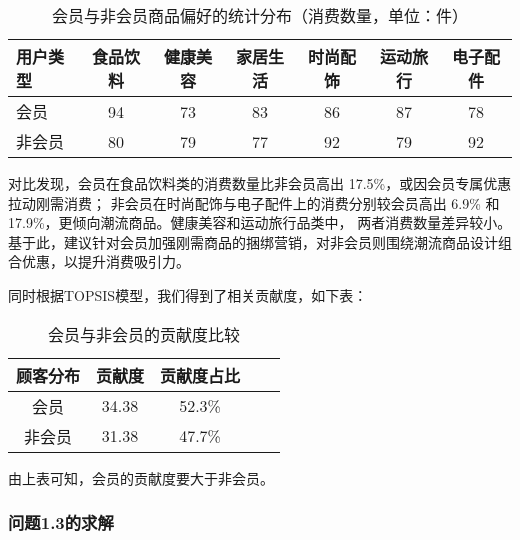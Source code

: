 \documentclass[withoutpreface,bwprint]{cumcmthesis}
\begin{document}
\begin{table}[H]
    \caption{会员与非会员商品偏好的统计分布（消费数量，单位：件）}
    \centering
    \fontsize{12}{14}\selectfont 
    \begin{tabular}{lcccccc}
        \toprule[1.5pt]
        \textbf{用户类型} & \textbf{食品饮料} & \textbf{健康美容} & \textbf{家居生活} & \textbf{时尚配饰} & \textbf{运动旅行} & \textbf{电子配件} \\
        \midrule[1pt]
        会员               & 94               & 73               & 83               & 86                & 87               & 78                 \\
        非会员             & 80               & 79               & 77               & 92                & 79               & 92                 \\
        \bottomrule[1.5pt]
    \end{tabular}
\end{table}
对比发现，会员在食品饮料类的消费数量比非会员高出 17.5\%，或因会员专属优惠拉动刚需消费；
非会员在时尚配饰与电子配件上的消费分别较会员高出 6.9\% 和 17.9\%，更倾向潮流商品。健康美容和运动旅行品类中，
两者消费数量差异较小。基于此，建议针对会员加强刚需商品的捆绑营销，对非会员则围绕潮流商品设计组合优惠，以提升消费吸引力。
\par
同时根据TOPSIS模型，我们得到了相关贡献度，如下表：
\begin{table}[H]
    \caption{会员与非会员的贡献度比较}%
    \centering
    \fontsize{12}{14}\selectfont   
    \begin{tabular}{ccccc}
        \toprule[1.5pt]
        顾客分布 & 贡献度 & 贡献度占比  \\
        \midrule[1pt]
        会员 & 34.38 &52.3\%\\
        非会员 & 31.38 & 47.7\% \\
        \bottomrule[1.5pt]
    \end{tabular}
\end{table}
\par
由上表可知，会员的贡献度要大于非会员。

\subsubsection {问题1.3的求解}
\end{document}
